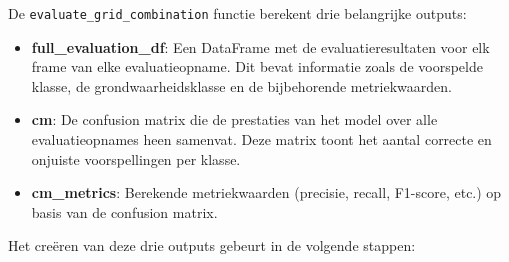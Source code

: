 De \texttt{evaluate\_grid\_combination} functie berekent drie belangrijke outputs:
\begin{itemize}
    \item \textbf{full\_evaluation\_df}: Een DataFrame met de evaluatieresultaten voor elk frame van elke evaluatieopname.
    Dit bevat informatie zoals de voorspelde klasse, de grondwaarheidsklasse en de bijbehorende metriekwaarden.
    \item \textbf{cm}: De confusion matrix die de prestaties van het model over alle evaluatieopnames heen samenvat.
    Deze matrix toont het aantal correcte en onjuiste voorspellingen per klasse.
    \item \textbf{cm\_metrics}: Berekende metriekwaarden (precisie, recall, F1-score, etc.) op basis van de confusion matrix.
\end{itemize}

Het creëren van deze drie outputs gebeurt in de volgende stappen:


